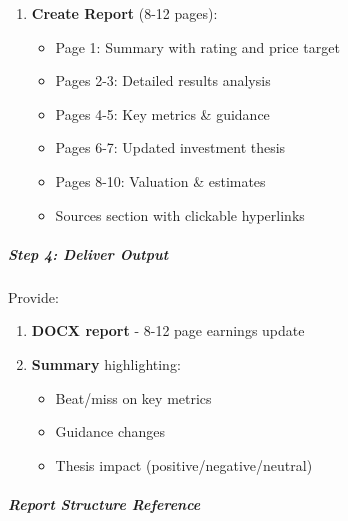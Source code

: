\documentclass[11pt]{article}
\begin{document}
\begin{enumerate}[leftmargin=*,itemsep=2pt,topsep=2pt]
\item {} \textbf{Create Report} (8-12 pages):
\begin{itemize}[leftmargin=*,itemsep=2pt,topsep=2pt]
\item {} Page 1: Summary with rating and price target
\item {} Pages 2-3: Detailed results analysis
\item {} Pages 4-5: Key metrics \& guidance
\item {} Pages 6-7: Updated investment thesis
\item {} Pages 8-10: Valuation \& estimates
\item {} Sources section with clickable hyperlinks
\end{itemize}
\end{enumerate}

\subparagraph{Step 4: Deliver Output}\mbox{}\par

Provide:

\begin{enumerate}[leftmargin=*,itemsep=2pt,topsep=2pt]
\item {} \textbf{DOCX report} - 8-12 page earnings update
\item {} \textbf{Summary} highlighting:
\begin{itemize}[leftmargin=*,itemsep=2pt,topsep=2pt]
\item {} Beat/miss on key metrics
\item {} Guidance changes
\item {} Thesis impact (positive/negative/neutral)
\end{itemize}
\end{enumerate}

\subparagraph{Report Structure Reference}\mbox{}\par
\end{document}
